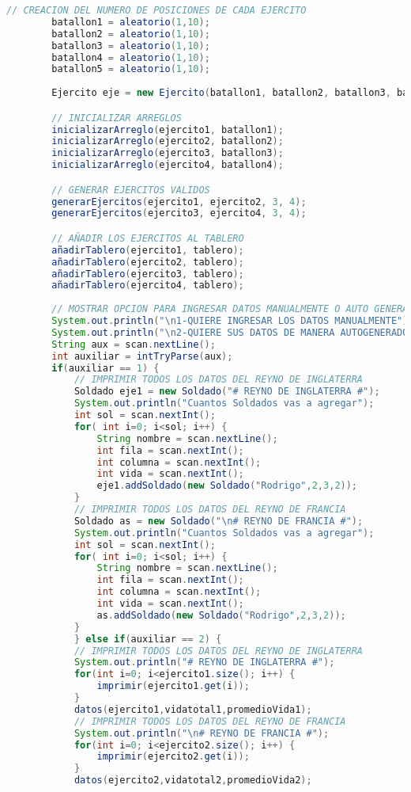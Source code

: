 \documentclass{article}
\begin{document}
\begin{itemize}
\begin{itemize}
\begin{lstlisting}[language=java]
		// CREACION DEL NUMERO DE POSICIONES DE CADA EJERCITO
		batallon1 = aleatorio(1,10);
		batallon2 = aleatorio(1,10);
		batallon3 = aleatorio(1,10);
		batallon4 = aleatorio(1,10);
		batallon5 = aleatorio(1,10);
		
		Ejercito eje = new Ejercito(batallon1, batallon2, batallon3, batallon4, batallon5);

		// INICIALIZAR ARREGLOS
		inicializarArreglo(ejercito1, batallon1);
		inicializarArreglo(ejercito2, batallon2);
		inicializarArreglo(ejercito3, batallon3);
		inicializarArreglo(ejercito4, batallon4);

		// GENERAR EJERCITOS VALIDOS
		generarEjercitos(ejercito1, ejercito2, 3, 4);
		generarEjercitos(ejercito3, ejercito4, 3, 4);

		// AÑADIR LOS EJERCITOS AL TABLERO
		añadirTablero(ejercito1, tablero);
		añadirTablero(ejercito2, tablero);
		añadirTablero(ejercito3, tablero);
		añadirTablero(ejercito4, tablero);
		
		// MOSTRAR OPCION PARA INGRESAR DATOS MANUALMENTE O AUTO GENERADO
		System.out.println("\n1-QUIERE INGRESAR LOS DATOS MANUALMENTE");
		System.out.println("\n2-QUIERE SUS DATOS DE MANERA AUTOGENERADO");
		String aux = scan.nextLine();
		int auxiliar = intTryParse(aux);
		if(auxiliar == 1) {
			// IMPRIMIR TODOS LOS DATOS DEL REYNO DE INGLATERRA
			Soldado eje1 = new Soldado("# REYNO DE INGLATERRA #");
			System.out.println("Cuantos Soldados vas a agregar");
			int sol = scan.nextInt();
			for( int i=0; i<sol; i++) {
				String nombre = scan.nextLine();
				int fila = scan.nextInt();
				int columna = scan.nextInt();
				int vida = scan.nextInt();
				eje1.addSoldado(new Soldado("Rodrigo",2,3,2));
			}
			// IMPRIMIR TODOS LOS DATOS DEL REYNO DE FRANCIA
			Soldado as = new Soldado("\n# REYNO DE FRANCIA #");
			System.out.println("Cuantos Soldados vas a agregar");
			int sol = scan.nextInt();
			for( int i=0; i<sol; i++) {
				String nombre = scan.nextLine();
				int fila = scan.nextInt();
				int columna = scan.nextInt();
				int vida = scan.nextInt();
				as.addSoldado(new Soldado("Rodrigo",2,3,2));
			}
		    } else if(auxiliar == 2) {
			// IMPRIMIR TODOS LOS DATOS DEL REYNO DE INGLATERRA
			System.out.println("# REYNO DE INGLATERRA #");
			for(int i=0; i<ejercito1.size(); i++) {
				imprimir(ejercito1.get(i));
			}
			datos(ejercito1,vidatotal1,promedioVida1);
			// IMPRIMIR TODOS LOS DATOS DEL REYNO DE FRANCIA
			System.out.println("\n# REYNO DE FRANCIA #");
			for(int i=0; i<ejercito2.size(); i++) {
				imprimir(ejercito2.get(i));
			}
			datos(ejercito2,vidatotal2,promedioVida2);
			

\end{lstlisting}
\end{itemize}
\end{itemize}
\end{document}
